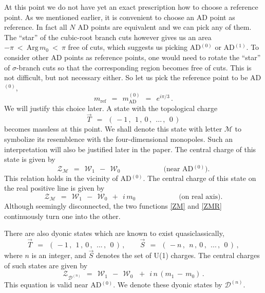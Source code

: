 \documentclass[epsfig,12pt]{article}
\def\beq{\begin{equation}}
\def\eeq{\end{equation}}
\def\beq{\begin{equation}}
\def\eeq{\end{equation}}
\newcommand{\mc}[1]{\mathcal{#1}}
\newcommand{\W}{\mathcal{W}}
\begin{document}
	At this point we do not have yet an exact prescription how to choose a reference point.
	As we mentioned earlier, it is convenient to choose an AD point as reference.
	In fact all $ N $ AD points are equivalent and we can pick any of them.
	The ``star'' of the cubic-root branch cuts however gives us 
	an area $  -\pi ~<~ \text{Arg}\, m_0 ~<~ \pi $ free of cuts,
	which suggests us picking AD$^{(0)}$ or AD$^{(1)}$.
	To consider other AD points as reference points, 
	one would need to rotate the ``star'' of $\sigma$-branch cuts so that the corresponding region becomes
	free of cuts.
	This is not difficult, but not necessary either.
	So let us pick the reference point to be AD$^{(0)}$, 
\beq
	m_\text{ref} ~~=~~ m_\text{AD}^{(0)} ~~=~~ e^{i \pi / 3}\,.
\eeq
	We will justify this choice later.
	A state with the topological charge
\beq
	\vec{T} ~~=~~ (\, -1\,,~~ 1\,,~ 0 \,,~~ ...\,,~~ 0 \,)
\eeq
	becomes massless at this point.
	We shall denote this state with letter $ \mc{M} $ to symbolize its resemblence with 
	the four-dimensional monopoles. 
	Such an interpretation will also be justified later in the paper.
	The central charge of this state is given by
\beq
\label{ZM}
	\mc{Z_M} ~~=~~ \W_1 ~~-~~ \W_0
	\qquad\qquad\qquad
	\text{(near AD$^{(0)}$).}
\eeq
	This relation holds in the vicinity of AD$^{(0)}$.
	The central charge of this state on the real positive line is given by
\beq
\label{ZMR}
	\mc{Z_M} ~~=~~ \W_1 ~~-~~ \W_0 ~~+~~ i\, m_0
	\qquad\qquad\qquad
	\text{(on real axis).}
\eeq
	Although seemingly disconnected, the two functions \eqref{ZM} and \eqref{ZMR} 
	continuously turn one into the other.

	There are also dyonic states which are known to exist quasiclassically,
\beq
	\vec{T} ~~=~~ (\, -1\,,~~ 1\,,~ 0 \,,~~ ...\,,~~ 0 \,)\,, \qquad
	\vec{S} ~~=~~ (\, -n\,,~~ n\,,~ 0 \,,~~ ...\,,~~ 0 \,)\,, 
\eeq
	where $ n $ is an integer, and $ \vec{S} $ denotes the set of U(1) charges.
	The central charges of such states are given by 
\beq
	\mc{Z}_{\mc{D}^{(n)}} ~~=~~ \W_1 ~~-~~ \W_0\, ~~+~~ i\, n\, ( m_1 \,-\, m_0 ) \,.
\eeq
	This equation is valid near AD$^{(0)}$.
	We denote these dyonic states by $ \mc{D}^{(n)} $.
\end{document}
